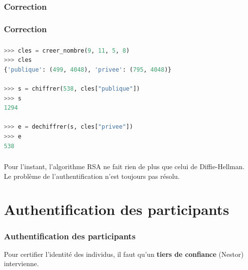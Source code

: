 \documentclass[svgnames,11pt]{beamer}
\begin{document}
\begin{frame}
    \frametitle{Correction}

    \begin{center}
        
    \end{center}

\end{frame}
\begin{frame}
    \frametitle{Correction}

    \begin{center}
        
    \end{center}

\end{frame}
\begin{frame}[fragile]
    \frametitle{}

    
\begin{center}
\begin{lstlisting}[language=Python , basicstyle=\ttfamily\small, xleftmargin=0.2em, xrightmargin=0em]
>>> cles = creer_nombre(9, 11, 5, 8)
>>> cles
{'publique': (499, 4048), 'privee': (795, 4048)}

>>> s = chiffrer(538, cles["publique"])
>>> s
1294

>>> e = dechiffrer(s, cles["privee"])
>>> e
538
\end{lstlisting}
\end{center}
\end{frame}
\begin{frame}
    \frametitle{}

\begin{center}
    Pour l'instant, l'algorithme RSA ne fait rien de plus que celui de Diffie-Hellman. Le problème de l'authentification n'est toujours pas résolu.

\end{center}

\end{frame}
\section{Authentification des participants}
\begin{frame}
    \frametitle{Authentification des participants}
\begin{aretenir}[]
Pour certifier l'identité des individus, il faut qu'un \textbf{tiers de confiance} (Nestor) intervienne.
\end{aretenir}
\end{frame}
\end{document}
